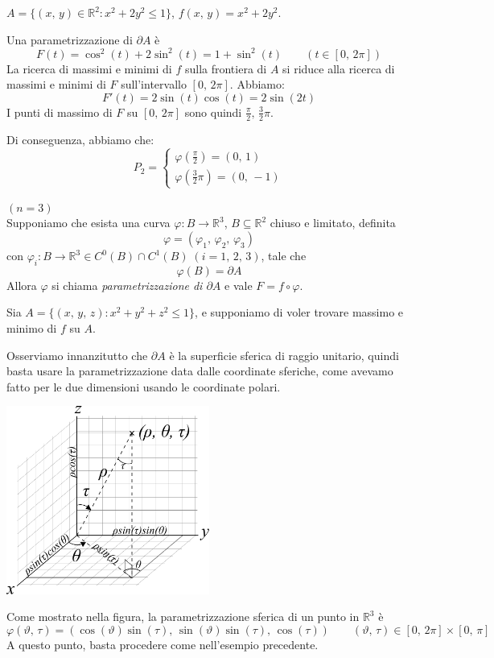 \begin{example}
$A = \lbrace (x,\,y) \in \mathbb{R}^2 : x^2 + 2y^2 \leq 1 \rbrace$, $f(x,\,y) = x^2 + 2y^2$.

Una parametrizzazione di $\partial A$ è
$$
F(t) = \cos^2(t) + 2\sin^2(t) = 1 + \sin^2(t) \qquad (t \in [0,\,2\pi])
$$
La ricerca di massimi e minimi di $f$ sulla frontiera di $A$ si riduce alla ricerca di massimi e minimi di $F$ sull'intervallo $[0,\,2\pi]$. Abbiamo:
$$
F'(t) = 2\sin(t)\cos(t) = 2\sin(2t)
$$
I punti di massimo di $F$ su $[0,\,2\pi]$ sono quindi $\displaystyle \frac{\pi}{2},\,\frac{3}{2}\pi$.

Di conseguenza, abbiamo che:
$$
P_2 =
\begin{cases}
\varphi \left( \frac{\pi}{2} \right) = (0,\,1)\\
\varphi \left( \frac{3}{2}\pi \right) = (0,\,-1)
\end{cases}
$$
\end{example}

\noindent \underline{$(n = 3)$}\\
Supponiamo che esista una curva $\varphi : B \longrightarrow \mathbb{R}^3$, $B \subseteq \mathbb{R}^2$ chiuso e limitato, definita
$$
\varphi = \left( \varphi_1,\,\varphi_2,\,\varphi_3 \right)
$$
con $\varphi_i : B \longrightarrow \mathbb{R}^3 \in C^0(B) \cap C^1(B) \; (i = 1,\,2,\,3)$, tale che
$$
\varphi (B) = \partial A
$$
Allora $\varphi$ si chiama \emph{parametrizzazione di $\partial A$} e vale $F = f \circ \varphi$.

\begin{example}
Sia $A = \lbrace (x,\,y,\,z) : x^2 + y^2 + z^2 \leq 1 \rbrace$, e supponiamo di voler trovare massimo e minimo di $f$ su $A$.

Osserviamo innanzitutto che $\partial A$ è la superficie sferica di raggio unitario, quindi basta usare la parametrizzazione data dalle coordinate sferiche, come avevamo fatto per le due dimensioni usando le coordinate polari.
\begin{center}
\includegraphics[width=0.5\textwidth]{spherical_coord.pdf}
\end{center}
Come mostrato nella figura, la parametrizzazione sferica di un punto in $\mathbb{R}^3$ è
$$
\varphi (\vartheta,\,\tau) = \left( \cos(\vartheta)\sin(\tau),\, \sin(\vartheta)\sin(\tau),\, \cos(\tau) \right) \qquad (\vartheta,\,\tau) \in [0,\,2\pi] \times [0,\,\pi]
$$
A questo punto, basta procedere come nell'esempio precedente.
\end{example}



